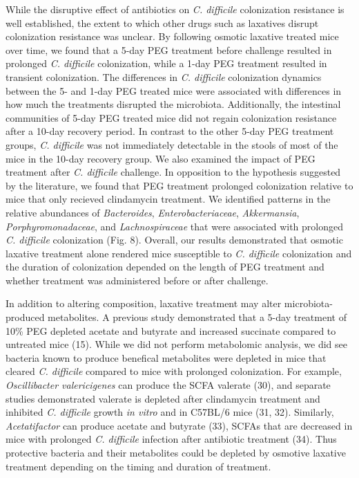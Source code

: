 \documentclass[
  11pt,
]{article}
\begin{document}
While the disruptive effect of antibiotics on \emph{C. difficile}
colonization resistance is well established, the extent to which other
drugs such as laxatives disrupt colonization resistance was unclear. By
following osmotic laxative treated mice over time, we found that a 5-day
PEG treatment before challenge resulted in prolonged \emph{C. difficile}
colonization, while a 1-day PEG treatment resulted in transient
colonization. The differences in \emph{C. difficile} colonization
dynamics between the 5- and 1-day PEG treated mice were associated with
differences in how much the treatments disrupted the microbiota.
Additionally, the intestinal communities of 5-day PEG treated mice did
not regain colonization resistance after a 10-day recovery period. In
contrast to the other 5-day PEG treatment groups, \emph{C. difficile}
was not immediately detectable in the stools of most of the mice in the
10-day recovery group. We also examined the impact of PEG treatment
after \emph{C. difficile} challenge. In opposition to the hypothesis
suggested by the literature, we found that PEG treatment prolonged
colonization relative to mice that only recieved clindamycin treatment.
We identified patterns in the relative abundances of \emph{Bacteroides},
\emph{Enterobacteriaceae}, \emph{Akkermansia},
\emph{Porphyromonadaceae}, and \emph{Lachnospiraceae} that were
associated with prolonged \emph{C. difficile} colonization (Fig. 8).
Overall, our results demonstrated that osmotic laxative treatment alone
rendered mice susceptible to \emph{C. difficile} colonization and the
duration of colonization depended on the length of PEG treatment and
whether treatment was administered before or after challenge.

In addition to altering composition, laxative treatment may alter
microbiota-produced metabolites. A previous study demonstrated that a
5-day treatment of 10\% PEG depleted acetate and butyrate and increased
succinate compared to untreated mice (15). While we did not perform
metabolomic analysis, we did see bacteria known to produce benefical
metabolites were depleted in mice that cleared \emph{C. difficile}
compared to mice with prolonged colonization. For example,
\emph{Oscillibacter valericigenes} can produce the SCFA valerate (30),
and separate studies demonstrated valerate is depleted after clindamycin
treatment and inhibited \emph{C. difficile} growth \emph{in vitro} and
in C57BL/6 mice (31, 32). Similarly, \emph{Acetatifactor} can produce
acetate and butyrate (33), SCFAs that are decreased in mice with
prolonged \emph{C. difficile} infection after antibiotic treatment (34).
Thus protective bacteria and their metabolites could be depleted by
osmotive laxative treatment depending on the timing and duration of
treatment.
\end{document}
